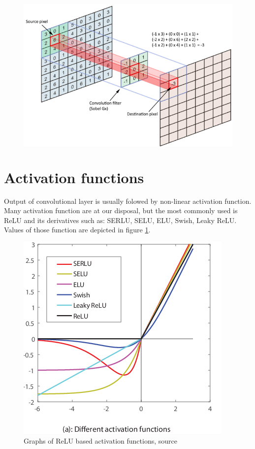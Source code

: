 \begin{figure}
    \centering
    \includegraphics[width=0.9\linewidth]{images/conv_img.png}
\end{figure}

\section{Activation functions}
Output of convolutional layer is usually folowed by non-linear activation function. Many activation function are at our disposal, but the most commonly used is ReLU and its derivatives such as: SERLU, SELU, ELU, Swish, Leaky ReLU. Values of those function are depicted in figure \ref{fig:activation_functions}.

\begin{figure}
    \centering
    \includegraphics[width=0.6\linewidth]{images/activation_functions.png}
    \caption{Graphs of ReLU based activation functions, source \cite{Zhang2018}}
    \label{fig:activation_functions}
\end{figure}

